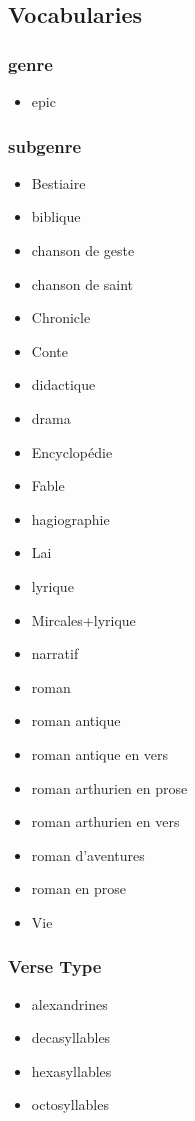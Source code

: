 
\subsection{Vocabularies}

\subsubsection{genre}
\begin{itemize}
    \item epic
\end{itemize}

\subsubsection{subgenre}
\begin{multicols}{3}

\begin{itemize}
    \item Bestiaire
    \item biblique
    \item chanson de geste
    \item chanson de saint
    \item Chronicle
    \item Conte
    \item didactique
    \item drama
    \item Encyclopédie
    \item Fable
    \item hagiographie
    \item Lai
    \item lyrique
    \item Mircales+lyrique
    \item narratif
    \item roman
    \item roman antique
    \item roman antique en vers
    \item roman arthurien en prose
    \item roman arthurien en vers
    \item roman d'aventures
    \item roman en prose
    \item Vie
\end{itemize}

\end{multicols}

\subsubsection{Verse Type}
\begin{itemize}
    \item alexandrines
    \item decasyllables
    \item hexasyllables
    \item octosyllables
\end{itemize}


